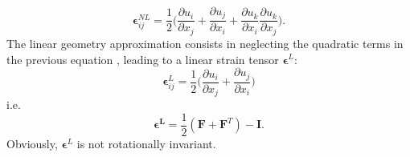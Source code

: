 \documentclass[twocolumn,amsmath,amssymb]{revtex4}
\begin{document}
\begin{equation}
\label{nonlin}\bm{\epsilon}^{NL}_{ij}= \frac{1}{2}
\biggl(\frac{\partial u_i}{\partial x_j}
+
\frac{\partial u_j}{\partial x_i}
+
\frac{\partial u_k}{\partial x_i}
\frac{\partial u_k}{\partial x_j}
\biggr).
\end{equation}
%
The linear geometry approximation consists in neglecting the quadratic terms in the previous equation \cite{Bha03,LanLif84}, leading to a linear strain tensor $\bm \epsilon ^L$:
%
\begin{equation}
\label{lin}\bm{\epsilon}^{L}_{ij}= \frac{1}{2}
\biggl(\frac{\partial u_i}{\partial x_j}
+
\frac{\partial u_j}{\partial x_i}
\biggr)
\end{equation}
%
i.e. \begin{equation}
\label{lin2}
\bm{\epsilon^{L}}= \frac12\left(\bm{F}+\bm{F}^T\right)-\bm{I}.
\end{equation}
 Obviously, $\bm \epsilon^L$ is not rotationally invariant.
%
\end{document}
